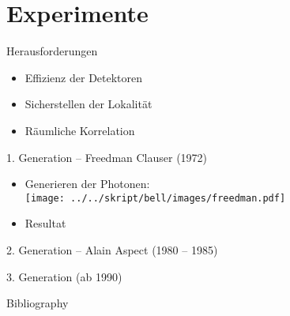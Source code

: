 \documentclass{beamer}
\begin{document}
\section{Experimente}
\begin{frame}{Herausforderungen}
    \begin{itemize}[<+->]
        \item Effizienz der Detektoren
        \item Sicherstellen der Lokalit\"at
        \item R\"aumliche Korrelation
    \end{itemize}
\end{frame}
\begin{frame}{1. Generation -- Freedman Clauser (1972)}
    \begin{itemize}
        \item Generieren der Photonen: \\
            {
                \centering
                \texttt{[image: ../../skript/bell/images/freedman.pdf]}
            }
        \item Resultat
    \end{itemize}

\end{frame}
\begin{frame}{2. Generation -- Alain Aspect (1980 -- 1985)}
\end{frame}
\begin{frame}{3. Generation (ab 1990)}
\end{frame}

\begin{frame}{Bibliography}
    
\end{frame}
\end{document}
